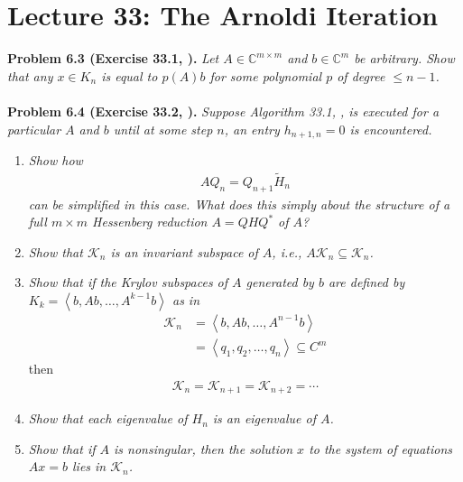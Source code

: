 \documentclass[a4paper,oneside]{book}
\numberwithin{equation}{chapter}
\begin{document}
\section{Lecture 33: The Arnoldi Iteration}
\textbf{Problem 6.3 (Exercise 33.1, \cite{1}).} \textit{Let $A\in \mathbb{C}^{m\times m}$ and $b\in \mathbb{C}^m$ be arbitrary. Show that any $x\in K_n$ is equal to $p\left(A\right)b$ for some polynomial $p$ of degree $\le n-1$.}\\
\\
\textbf{Problem 6.4 (Exercise 33.2, \cite{1}).} \textit{Suppose Algorithm 33.1, \cite{1}, is executed for a particular $A$ and $b$ until at some step $n$, an entry $h_{n+1,n}=0$ is encountered.}
\begin{enumerate}
\item \textit{Show how}
\begin{align}
A{Q_n} = {Q_{n + 1}}{{\tilde H}_n}
\end{align}
\textit{can be simplified in this case. What does this simply about the structure of a full $m\times m$ Hessenberg reduction $A=QHQ^*$ of $A$?}
\item \textit{Show that $\mathcal{K} _n$ is an invariant subspace of $A$, i.e., $A{\mathcal{K} _n} \subseteq {\mathcal{K} _n}$.}
\item \textit{Show that if the Krylov subspaces of $A$ generated by $b$ are defined by ${K_k} = \left\langle {b,Ab, \ldots ,{A^{k - 1}}b} \right\rangle $ as in}
\begin{align}
{\mathcal{K} _n} &= \left\langle {b,Ab, \ldots ,{A^{n - 1}}b} \right\rangle \\
& = \left\langle {{q_1},{q_2}, \ldots ,{q_n}} \right\rangle  \subseteq {C^m}
\end{align}
then 
\begin{align}
{\mathcal{K} _n} = {\mathcal{K} _{n + 1}} = {\mathcal{K} _{n + 2}} =  \cdots 
\end{align}
\item \textit{Show that each eigenvalue of $H_n$ is an eigenvalue of $A$.}
\item \textit{Show that if $A$ is nonsingular, then the solution $x$ to the system of equations $Ax=b$ lies in $\mathcal{K} _n$.}
\end{enumerate}
\end{document}
